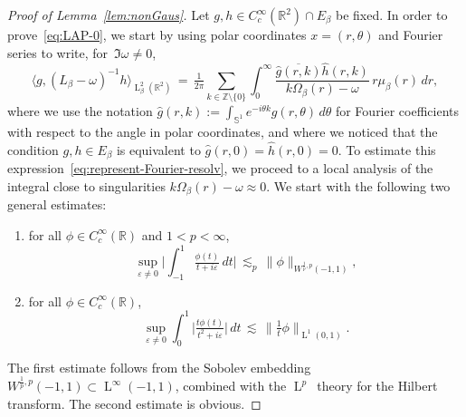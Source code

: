 \documentclass[a4paper,11pt,reqno,noindent]{amsart}
\theoremstyle{plain}
\numberwithin{equation}{section}
\newcommand{\e}{\varepsilon}
\newcommand{\R}{\mathbb R}
\newcommand{\Z}{\mathbb Z}
\newcommand{\Sp}{\mathbb S}
\newcommand{\3}{|\!|\!|}
\newcommand{\Ld}{\operatorname{L}}
\begin{document}
\begin{proof}[Proof of Lemma~\ref{lem:nonGaus}]
\medskip\noindent
Let $g,h\in C^\infty_c(\R^2)\cap E_\beta$ be fixed. In order to prove~\eqref{eq:LAP-0}, we start by using polar coordinates $x=(r,\theta)$ and Fourier series to write, for~$\Im\omega\ne0$,
\begin{equation}\label{eq:represent-Fourier-resolv}
\big\langle g,(L_\beta-\omega)^{-1}h\big\rangle_{\Ld^2_\beta(\R^2)}\,=\,\tfrac1{2\pi}\sum_{k\in\Z\setminus\{0\}}\int_0^\infty\frac{\overline{\hat g(r,k)}\hat h(r,k)}{k\Omega_\beta(r)-\omega}\,r\mu_\beta(r)\,dr,
\end{equation}
where we use the notation $\hat g(r,k):=\int_{\Sp^1}e^{-i\theta k}g(r,\theta)\,d\theta$ for Fourier coefficients with respect to the angle in polar coordinates,
and where we noticed that the condition $g,h\in E_\beta$ is equivalent to $\hat g(r,0)=\hat h(r,0)=0$.
To estimate this expression~\eqref{eq:represent-Fourier-resolv}, we proceed to a local analysis of the integral close to singularities $k\Omega_\beta(r)-\omega\approx0$. We start with the following two general estimates:
\begin{enumerate}[---]
\item for all $\phi\in C^\infty_c(\R)$ and $1<p<\infty$,
\begin{equation}\label{eq:model-crit-est}
\sup_{\e\ne0}\bigg|\int_{-1}^1 \tfrac{\phi(t)}{t+ i\e}\,dt\bigg|\,\lesssim_p\,\|\phi\|_{W^{\frac1p,p}(-1,1)},
\end{equation}
\item for all $\phi\in C^\infty_c(\R)$,
\begin{equation}\label{eq:model-crit-est-2}
\sup_{\e\ne0}\int_{0}^1 \Big|\tfrac{t\phi(t)}{t^2+ i\e}\Big|\,dt\,\lesssim\,
\|\tfrac1t\phi\|_{\Ld^1(0,1)}.
\end{equation}
\end{enumerate}
The first estimate follows from the Sobolev embedding $W^{\frac1p,p}(-1,1)\subset \Ld^\infty(-1,1)$, combined with the $\Ld^p$~theory for the Hilbert transform. The second estimate is obvious.


\end{proof}
\end{document}
